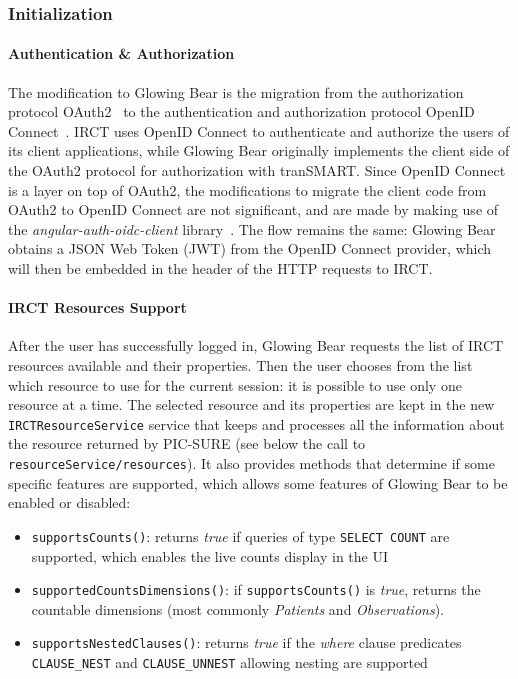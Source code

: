 \subsubsection{Initialization}

\paragraph{Authentication \& Authorization}
The modification to Glowing Bear is the migration from the authorization protocol OAuth2~\cite{oauth2} to the authentication and authorization protocol OpenID Connect~\cite{openidconnect}.
IRCT uses OpenID Connect to authenticate and authorize the users of its client applications, while Glowing Bear originally implements the client side of the OAuth2 protocol for authorization with tranSMART. 
Since OpenID Connect is a layer on top of OAuth2, the modifications to migrate the client code from OAuth2 to OpenID Connect are not significant, and are made by making use of the \emph{angular-auth-oidc-client} library~\cite{angular-auth-oidc-client}.
The flow remains the same: Glowing Bear obtains a JSON Web Token (JWT) from the OpenID Connect provider, which will then be embedded in the header of the HTTP requests to IRCT.

\paragraph{IRCT Resources Support}

After the user has successfully logged in, Glowing Bear requests the list of IRCT resources available and their properties.
Then the user chooses from the list which resource to use for the current session: it is possible to use only one resource at a time.
The selected resource and its properties are kept in the new \verb|IRCTResourceService| service that keeps and processes all the information about the resource returned by PIC-SURE (see below the call to \verb|resourceService/resources|).
It also provides methods that determine if some specific features are supported, which allows some features of Glowing Bear to be enabled or disabled:
\begin{itemize}
    \item \verb|supportsCounts()|: returns \emph{true} if queries of type \verb|SELECT COUNT| are supported, which enables the live counts display in the UI
    \item \verb|supportedCountsDimensions()|: if \verb|supportsCounts()| is \emph{true}, returns the countable dimensions (most commonly \emph{Patients} and \emph{Observations}).
    \item \verb|supportsNestedClauses()|: returns \emph{true} if the \emph{where} clause predicates \verb|CLAUSE_NEST| and \verb|CLAUSE_UNNEST| allowing nesting are supported
\end{itemize}

